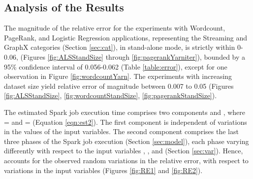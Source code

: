 \documentclass[conference]{IEEEtran}
\begin{document}
\subsection{Analysis of the Results}\label{sec:discussion}
The magnitude of the relative error   for the experiments with Wordcount, PageRank, and Logistic Regression
 applications, representing the Streaming and GraphX categories (Section \ref{sec:cat}), in stand-alone mode, is strictly within 0-0.06, (Figures \ref{fig:ALSStandSize} through \ref{fig:pagerankYarniter}), bounded by a 95\% confidence interval  of 0.056-0.062 (Table \ref{table:error}), except for one observation in Figure \ref{fig:wordcountYarn}.   The experiments with increasing dataset size yield relative error of magnitude between 0.007 to 0.05 (Figures \ref{fig:ALSStandSize}, \ref{fig:wordcountStandSize}, \ref{fig:pagerankStandSize}). \par The estimated Spark job execution time  comprises two components \emph{} and \emph{}, where  =  and  =  (Equation \ref{eqn:est2}). The first component  is independent of variations in the values of the input variables. The second component  comprises the last three phases of the Spark job execution (Section \ref{sec:model}), each phase varying differently with respect to the input variables , , and  (Section \ref{sec:var}). Hence,  accounts for the observed random variations in the relative error, with respect to variations in the input variables (Figures \ref{fig:RE1} and \ref{fig:RE2}).
\end{document}
